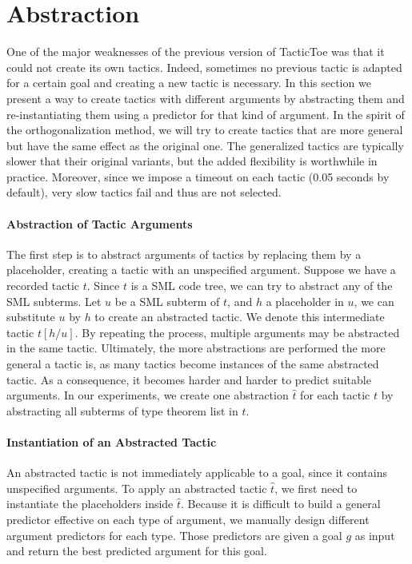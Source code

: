 \documentclass[runningheads,a4paper,draft]{svjour3}
\def\sml{\textsf{SML}\xspace}
\def\tactictoe{\textsf{TacticToe}\xspace}
\begin{document}
\section{Abstraction}\label{sec:synthesis}
One of the major weaknesses of the previous version of \tactictoe was that
it could not create its own tactics. Indeed, sometimes no previous tactic is
adapted for a certain goal and creating a new tactic is necessary.
In this section we present a way to create tactics with different arguments
by abstracting them and re-instantiating them using a predictor for that kind
of argument. In the spirit of the orthogonalization method, we will try to
create tactics that are more general but have the same effect as the
original one. The generalized tactics are typically slower that their
original variants, but the added flexibility is worthwhile in practice. Moreover,
since we impose a timeout on each tactic (0.05 seconds by default), very slow
tactics fail and thus are not selected.

\paragraph{Abstraction of Tactic Arguments}
The first step is to abstract arguments of tactics by replacing them by a
placeholder, creating a tactic with an unspecified argument.
Suppose we have a recorded tactic $t$. Since $t$ is a \sml code tree, we can
try to abstract any of the
\sml subterms. Let $u$ be a \sml subterm of $t$, and $h$ a placeholder in $u$, we
can substitute $u$ by $h$ to create an abstracted tactic.
We denote this intermediate tactic $t[h/u]$. By repeating the
process, multiple
arguments may be abstracted in the same tactic. Ultimately, the more
abstractions are performed the more general a tactic is, as many tactics
become instances of the same abstracted tactic. As a consequence, it becomes
harder and harder to predict suitable arguments. In our experiments, we create
one abstraction $\hat{t}$ for each tactic $t$ by abstracting all subterms of
type theorem list in $t$.

\paragraph{Instantiation of an Abstracted Tactic}
An abstracted tactic is not immediately applicable to a goal, since it contains
unspecified arguments. To apply an abstracted tactic $\hat{t}$, we first need
to
instantiate the placeholders inside $\hat{t}$. Because it is difficult to
build a general predictor effective on each type of argument, we manually
design different argument predictors for each type. Those predictors are
given a goal $g$ as input and return the best predicted argument for this
goal.
\end{document}
